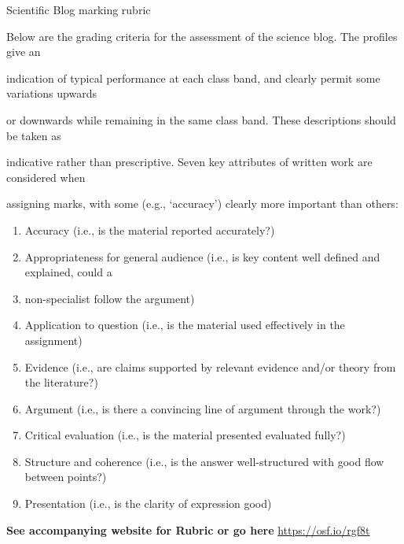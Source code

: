 \documentclass[
  11pt,
  letterpaper,
  oneside,
  open=any]{scrbook}
\providecommand{\tightlist}{%
  \setlength{\itemsep}{0pt}\setlength{\parskip}{0pt}}\usepackage{longtable,booktabs,array}
\begin{document}
\begin{tcolorbox}[enhanced jigsaw, rightrule=.15mm, opacitybacktitle=0.6, colbacktitle=quarto-callout-note-color!10!white, breakable, leftrule=.75mm, bottomtitle=1mm, toptitle=1mm, colback=white, titlerule=0mm, opacityback=0, title=\textcolor{quarto-callout-note-color}{\faInfo}\hspace{0.5em}{Blog Rubric example}, arc=.35mm, bottomrule=.15mm, toprule=.15mm, left=2mm, coltitle=black]

Scientific Blog marking rubric

Below are the grading criteria for the assessment of the science blog.
The profiles give an

indication of typical performance at each class band, and clearly permit
some variations upwards

or downwards while remaining in the same class band. These descriptions
should be taken as

indicative rather than prescriptive. Seven key attributes of written
work are considered when

assigning marks, with some (e.g., `accuracy') clearly more important
than others:

\begin{enumerate}
\def\labelenumi{\arabic{enumi}.}
\tightlist
\item
  Accuracy (i.e., is the material reported accurately?)
\item
  Appropriateness for general audience (i.e., is key content well
  defined and explained, could a
\item
  non-specialist follow the argument)
\item
  Application to question (i.e., is the material used effectively in the
  assignment)
\item
  Evidence (i.e., are claims supported by relevant evidence and/or
  theory from the literature?)
\item
  Argument (i.e., is there a convincing line of argument through the
  work?)
\item
  Critical evaluation (i.e., is the material presented evaluated fully?)
\item
  Structure and coherence (i.e., is the answer well-structured with good
  flow between points?)
\item
  Presentation (i.e., is the clarity of expression good)
\end{enumerate}

\textbf{See accompanying website for Rubric or go here}
\url{https://osf.io/rgf8t}

\end{tcolorbox}
\end{document}

